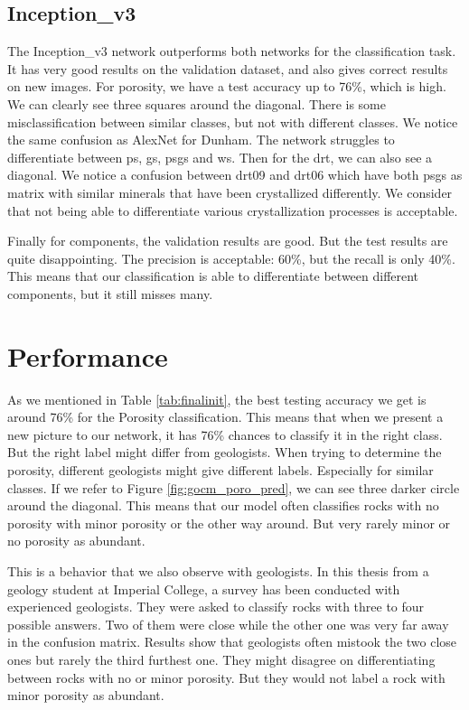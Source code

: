 \subsection{Inception\_v3}
The Inception\_v3 network outperforms both networks for the classification task. It has very good results on the validation dataset, and also gives correct results on new images. For porosity, we have a test accuracy up to 76\%, which is high. We can clearly see three squares around the diagonal. There is some misclassification between similar classes, but not with different classes. 
We notice the same confusion as AlexNet for Dunham. The network struggles to differentiate between \gls{ps}, \gls{gs}, \gls{psgs} and \gls{ws}. 
Then for the \gls{drt}, we can also see a diagonal. We notice a confusion between \gls{drt}09 and \gls{drt}06 which have both \gls{psgs} as matrix with similar minerals that have been crystallized differently. We consider that not being able to differentiate various crystallization processes is acceptable. 

Finally for components, the validation results are good. But the test results are quite disappointing. The precision is acceptable: 60\%, but the recall is only 40\%. This means that our classification is able to differentiate between different components, but it still misses many.

\section{Performance} \label{sec:perf}

As we mentioned in Table \ref{tab:finalinit}, the best testing accuracy we get is around 76\% for the Porosity classification. This means that when we present a new picture to our network, it has 76\% chances to classify it in the right class. But the right label might differ from geologists. When trying to determine the porosity, different geologists might give different labels. Especially for similar classes. If we refer to Figure \ref{fig:gocm_poro_pred}, we can see three darker circle around the diagonal. This means that our model often classifies rocks with no porosity with minor porosity or the other way around. But very rarely minor or no porosity as abundant.

This is a behavior that we also observe with geologists. In this thesis from a geology student at Imperial College, a survey has been conducted with experienced geologists\cite{thesis_imperial}. They were asked to classify rocks with three to four possible answers. Two of them were close while the other one was very far away in the confusion matrix. Results show that geologists often mistook the two close ones but rarely the third furthest one. 
They might disagree on differentiating between rocks with no or minor porosity. But they would not label a rock with minor porosity as abundant. 

